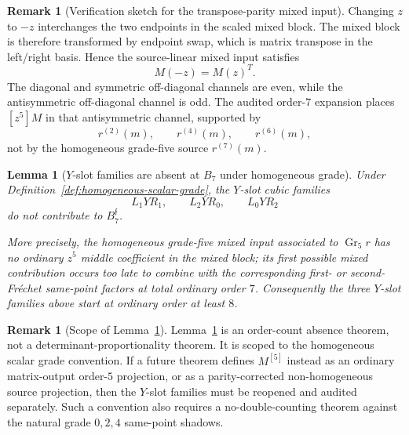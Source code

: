 \documentclass[11pt,a4paper]{amsart}
\theoremstyle{plain}
\newtheorem{lemma}[theorem]{Lemma}
\theoremstyle{definition}
\newtheorem{remark}[theorem]{Remark}
\begin{document}
\begin{remark}[Verification sketch for the transpose-parity mixed input]
\label{rem:verification-sketch-transpose-parity-mixed-input}
Changing \(z\) to \(-z\) interchanges the two endpoints in the scaled mixed
block.  The mixed block is therefore transformed by endpoint swap, which is
matrix transpose in the left/right basis.  Hence the source-linear mixed
input satisfies
\[
M(-z)=M(z)^T.
\]
The diagonal and symmetric off-diagonal channels are even, while the
antisymmetric off-diagonal channel is odd.  The audited order-\(7\)
expansion places \([z^5]M\) in that antisymmetric channel, supported by
\[
r^{(2)}(m),\qquad r^{(4)}(m),\qquad r^{(6)}(m),
\]
not by the homogeneous grade-five source \(r^{(7)}(m)\).
\end{remark}

\begin{lemma}[\(Y\)-slot families are absent at \(B_7\) under homogeneous grade]
\label{lem:y-slot-families-absent-homogeneous-grade}
Under Definition~\ref{def:homogeneous-scalar-grade}, the \(Y\)-slot cubic
families
\[
L_1YR_1,\qquad
L_2YR_0,\qquad
L_0YR_2
\]
do not contribute to \(B_7^{\mathfrak f}\).

More precisely, the homogeneous grade-five mixed input associated to
\(\operatorname{Gr}_5 r\) has no ordinary \(z^5\) middle coefficient in the
mixed block; its first possible mixed contribution occurs too late to combine
with the corresponding first- or second-Fr\'echet same-point factors at total
ordinary order \(7\).  Consequently the three \(Y\)-slot families above start
at ordinary order at least \(8\).
\end{lemma}

\begin{remark}[Scope of Lemma~\ref{lem:y-slot-families-absent-homogeneous-grade}]
\label{rem:scope-y-slot-absence-homogeneous-grade}
Lemma~\ref{lem:y-slot-families-absent-homogeneous-grade} is an order-count
absence theorem, not a determinant-proportionality theorem.  It is scoped to
the homogeneous scalar grade convention.  If a future theorem defines
\(M^{[5]}\) instead as an ordinary matrix-output order-\(5\) projection, or
as a parity-corrected non-homogeneous source projection, then the \(Y\)-slot
families must be reopened and audited separately.  Such a convention also
requires a no-double-counting theorem against the natural grade \(0,2,4\)
same-point shadows.
\end{remark}
\end{document}
